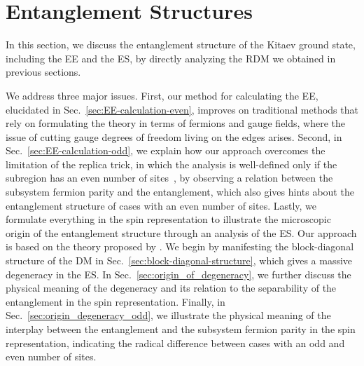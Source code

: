 \section{Entanglement Structures}\label{sec:entanglement-structures}
In this section, we discuss the entanglement structure of the Kitaev ground state, including the EE and the ES, by directly analyzing the RDM we obtained in previous sections. 

We address three major issues. First, our method for calculating the EE, elucidated in Sec.~\ref{sec:EE-calculation-even}, improves on traditional methods that rely on formulating the theory in terms of fermions and gauge fields, where the issue of cutting gauge degrees of freedom living on the edges arises. Second, in Sec.~\ref{sec:EE-calculation-odd}, we explain how our approach overcomes the limitation of the replica trick, in which the analysis is well-defined only if the subregion has an even number of sites~\cite{Yao-Qi_2010}, by observing a relation between the subsystem fermion parity and the entanglement, which also gives hints about the entanglement structure of cases with an even number of sites. Lastly, we formulate everything in the spin representation to illustrate the microscopic origin of the entanglement structure through an analysis of the ES. Our approach is based on the theory proposed by \cite{Xu-Rakovszky-Knap-Pollmann_2025}. We begin by manifesting the block-diagonal structure of the DM in Sec.~\ref{sec:block-diagonal-structure}, which gives a massive degeneracy in the ES. In Sec.~\ref{sec:origin_of_degeneracy}, we further discuss the physical meaning of the degeneracy and its relation to the separability of the entanglement in the spin representation. Finally, in Sec.~\ref{sec:origin_degeneracy_odd}, we illustrate the physical meaning of the interplay between the entanglement and the subsystem fermion parity in the spin representation, indicating the radical difference between cases with an odd and even number of sites.







